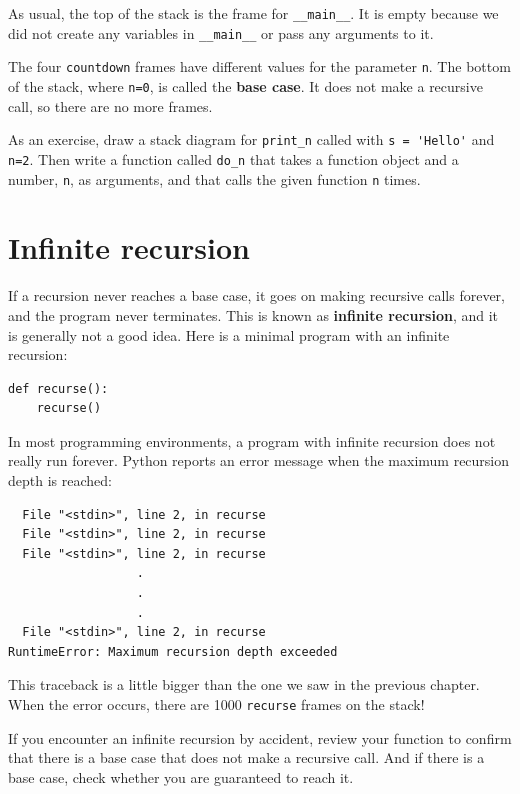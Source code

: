 \documentclass[10pt]{book}
\begin{document}
As usual, the top of the stack is the frame for \verb"__main__".
It is empty because we did not create any variables in 
\verb"__main__" or pass any arguments to it.

The four {\tt countdown} frames have different values for the
parameter {\tt n}.  The bottom of the stack, where {\tt n=0}, is
called the {\bf base case}.  It does not make a recursive call, so
there are no more frames.

As an exercise, draw a stack diagram for \verb"print_n" called with
\verb"s = 'Hello'" and {\tt n=2}.
Then write a function called \verb"do_n" that takes a function
object and a number, {\tt n}, as arguments, and that calls
the given function {\tt n} times.


\section{Infinite recursion}

If a recursion never reaches a base case, it goes on making
recursive calls forever, and the program never terminates.  This is
known as {\bf infinite recursion}, and it is generally not
a good idea.  Here is a minimal program with an infinite recursion:

\begin{verbatim}
def recurse():
    recurse()
\end{verbatim}
%
In most programming environments, a program with infinite recursion
does not really run forever.  Python reports an error
message when the maximum recursion depth is reached:

\begin{verbatim}
  File "<stdin>", line 2, in recurse
  File "<stdin>", line 2, in recurse
  File "<stdin>", line 2, in recurse
                  .   
                  .
                  .
  File "<stdin>", line 2, in recurse
RuntimeError: Maximum recursion depth exceeded
\end{verbatim}
%
This traceback is a little bigger than the one we saw in the
previous chapter.  When the error occurs, there are 1000
{\tt recurse} frames on the stack!

If you encounter an infinite recursion by accident, review
your function to confirm that there is a base case that does not
make a recursive call.  And if there is a base case, check whether
you are guaranteed to reach it.
\end{document}
